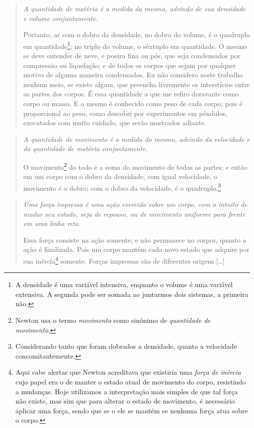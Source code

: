 \begin{quote}
\emph{A quantidade de matéria é a medida da mesma, advindo de sua densidade e volume conjuntamente.}
  
Portanto, ar com o dobro da densidade, no dobro do volume, é o quadruplo em quantidade\footnote{A densidade é uma variável intensiva, enquanto o volume é uma variável extensiva. A segunda pode ser somada ao juntarmos dois sistemas, a primeira não.}; no triplo do volume, o sêxtuplo em quantidade. O mesmo se deve entender de neve, e poeira fina ou pós, que seja condensados por compressão ou liquefação; e de todos os corpos que sejam por qualquer motivo de alguma maneira condensados. Eu não considero neste trabalho nenhum meio, se existe algum, que preencha livremente os interstícios entre as partes dos corpos. É essa quantidade a que me refiro doravante como corpo ou massa. E o mesmo é conhecido como peso de cada corpo; pois é proporcional ao peso, como descobri por experimentos em pêndulos, executados com muito cuidado, que serão mostrados adiante.
\end{quote}

\begin{quote}
\emph{A quantidade de movimento é a medida do mesmo, advindo da velocidade e da quantidade de matéria conjuntamente.}

O movimento\footnote{Newton usa o termo \emph{movimento} como sinônimo de \emph{quantidade de movimento}.} do todo é a soma do movimento de todas as partes; e então em um corpo com o dobro da densidade, com igual velocidade, o movimento é o dobro; com o dobro da velocidade, é o quadruplo.\footnote{Considerando tanto que foram dobrados a densidade, quanto a velocidade concomitantemente.}
\end{quote}

\begin{quote}
\emph{Uma força impressa é uma ação exercida sobre um corpo, com o intuito de mudar seu estado, seja de repouso, ou de movimento uniforme para frente em uma linha reta.}

Essa força consiste na ação somente; e não permanece no corpor, quanto a ação é finalizada. Pois um corpo mantém cada novo estado que adquire por sua inércia\footnote{Aqui cabe alertar que Newton acreditava que existiria uma \emph{força de inércia} cujo papel era o de manter o estado atual de movimento do corpo, resistindo a mudanças. Hoje utilizamos a interpretação mais simples de que tal força não existe, mas sim que para alterar o estado de movimento, é necessário aplicar uma força, sendo que se o ele se mantém se nenhuma força atua sobre o corpo.} somente. Forças impressas são de diferentes origens [\dots]
\end{quote}

